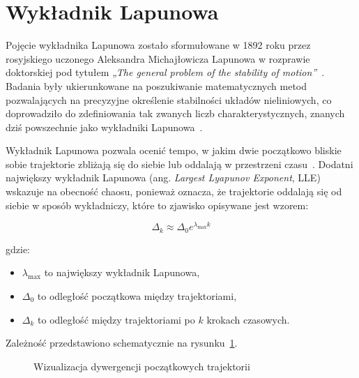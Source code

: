 \section{Wykładnik Lapunowa}
 
Pojęcie wykładnika Lapunowa zostało sformułowane w 1892 roku przez rosyjskiego uczonego Aleksandra Michajłowicza Lapunowa w rozprawie doktorskiej pod tytułem \textit{„The general problem of the stability of motion”}~\cite{lyapunov1992}. Badania były ukierunkowane na poszukiwanie matematycznych metod pozwalających na precyzyjne określenie stabilności układów nieliniowych, co doprowadziło do zdefiniowania tak zwanych liczb charakterystycznych, znanych dziś powszechnie jako wykładniki Lapunowa~\cite{wykładnikLaponowa1, wykładnikLaponowa2}.
 
Wykładnik Lapunowa pozwala ocenić tempo, w jakim dwie początkowo bliskie sobie trajektorie zbliżają się do siebie lub oddalają w przestrzeni czasu~\cite{wykładnikLaponowa3, wykładnikLaponowa4}. Dodatni największy wykładnik Lapunowa (ang. \textit{Largest Lyapunov Exponent}, LLE) wskazuje na obecność chaosu, ponieważ oznacza, że trajektorie oddalają się od siebie w sposób wykładniczy, które to zjawisko opisywane jest wzorem:
 
\begin{equation}
\Delta_k \approx \Delta_0 e^{\lambda_{\max} k}
\end{equation}
 
gdzie:
\begin{itemize}
    \item $\lambda_{\max}$ to największy wykładnik Lapunowa,
    \item $\Delta_0$ to odległość początkowa między trajektoriami,
    \item $\Delta_k$ to odległość między trajektoriami po $k$ krokach czasowych.
\end{itemize}
Zależność przedstawiono schematycznie na rysunku~\ref{fig:wykladnik_schemat}.
 
\begin{figure}[htbp]
    \centering
    \caption{Wizualizacja dywergencji początkowych trajektorii}
    \label{fig:wykladnik_schemat}
\end{figure}
 
